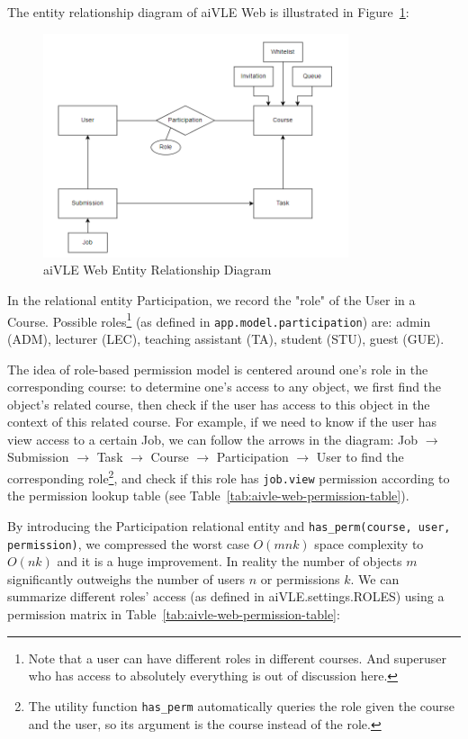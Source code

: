 The entity relationship diagram of aiVLE Web is illustrated in Figure~\ref{fig:aivle-web-er-diagram}:
\begin{figure}[H]
    \centering
    \includegraphics[width=0.8\textwidth]{images/aivle-web-er-diagram.png}
    \caption{aiVLE Web Entity Relationship Diagram}
    \label{fig:aivle-web-er-diagram}
\end{figure}

In the relational entity Participation, we record the "role" of the User in a Course. Possible roles\footnote{Note that a user can have different roles in different courses. And superuser who has access to absolutely everything is out of discussion here.} (as defined in \texttt{app.model.participation}) are: admin (ADM), lecturer (LEC), teaching assistant (TA), student (STU), guest (GUE).

The idea of role-based permission model is centered around one's role in the corresponding course: to determine one's access to any object, we first find the object's related course, then check if the user has access to this object in the context of this related course. For example, if we need to know if the user has view access to a certain Job, we can follow the arrows in the diagram: Job $\to$ Submission $\to$ Task $\to$ Course $\to$ Participation $\to$ User to find the corresponding role\footnote{The utility function \texttt{has\_perm} automatically queries the role given the course and the user, so its argument is the course instead of the role.}, and check if this role has \texttt{job.view} permission according to the permission lookup table (see Table~\ref{tab:aivle-web-permission-table}).

By introducing the Participation relational entity and \texttt{has\_perm(course, user, permission)}, we compressed the worst case $O(mnk)$ space complexity to $O(nk)$ and it is a huge improvement. In reality the number of objects $m$ significantly outweighs the number of users $n$ or permissions $k$. We can summarize different roles' access (as defined in aiVLE.settings.ROLES) using a permission matrix in Table~\ref{tab:aivle-web-permission-table}:

